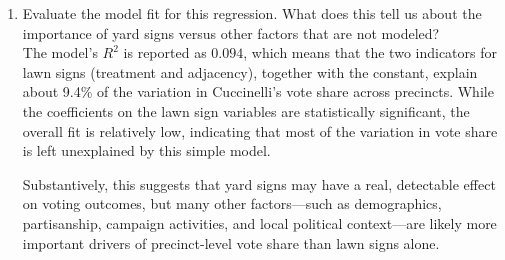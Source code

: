 \documentclass[12pt,letterpaper]{article}
\begin{document}
\begin{enumerate}
	\vspace{0.4cm}

	\item [(d)] Evaluate the model fit for this regression.  What does this	tell us about the importance of yard signs versus other factors that are not modeled? \\[0.2cm]
	\noindent
	The model’s $R^2$ is reported as $0.094$, which means that the two indicators for lawn signs (treatment and adjacency), together with the constant, explain about 9.4\% of the variation in Cuccinelli’s vote share across precincts. While the coefficients on the lawn sign variables are statistically significant, the overall fit is relatively low, indicating that most of the variation in vote share is left unexplained by this simple model.
	
	Substantively, this suggests that yard signs may have a real, detectable effect on voting outcomes, but many other factors—such as demographics, partisanship, campaign activities, and local political context—are likely more important drivers of precinct-level vote share than lawn signs alone.
	
\end{enumerate}  
\end{document}
